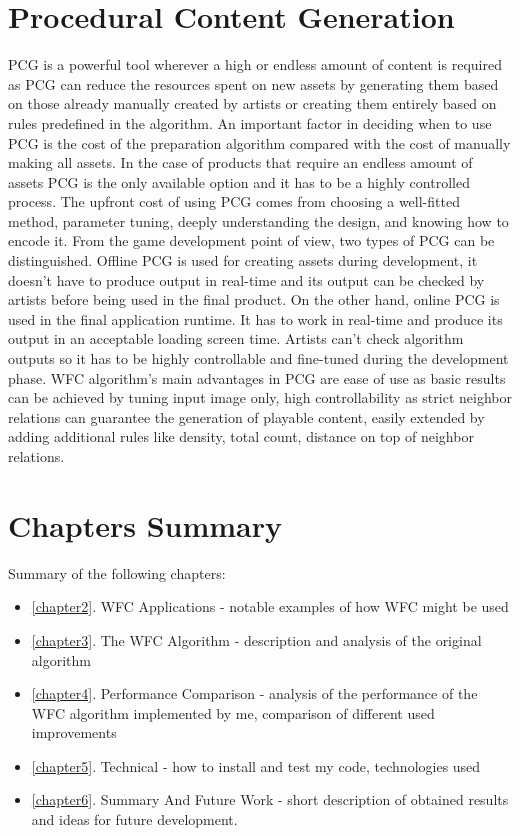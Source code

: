 \documentclass[shortabstract, english, inz]{iithesis}
\begin{document}
\section{Procedural Content Generation}
PCG is a powerful tool wherever a high or endless amount of content is required as PCG can reduce the resources spent on new assets by generating them based on those already manually created by artists or creating them entirely based on rules predefined in the algorithm. An important factor in deciding when to use PCG is the cost of the preparation algorithm compared with the cost of manually making all assets. In the case of products that require an endless amount of assets PCG is the only available option and it has to be a highly controlled process. The upfront cost of using PCG comes from choosing a well-fitted method, parameter tuning, deeply understanding the design, and knowing how to encode it.
From the game development point of view, two types of PCG can be distinguished. Offline PCG is used for creating assets during development, it doesn't have to produce output in real-time and its output can be checked by artists before being used in the final product. On the other hand, online PCG is used in the final application runtime. It has to work in real-time and produce its output in an acceptable loading screen time. Artists can't check algorithm outputs so it has to be highly controllable and fine-tuned during the development phase.\cite{DesignLevelConstraints}\break\break
WFC algorithm's main advantages in PCG are ease of use as basic results can be achieved by tuning input image only, high controllability as strict neighbor relations can guarantee the generation of playable content, easily extended by adding additional rules like density, total count, distance on top of neighbor relations. \cite{Smith, DesignLevelConstraints}

\section{Chapters Summary}
Summary of the following chapters:
\begin{itemize}
    \item \ref{chapter2}. WFC Applications - notable examples of how WFC might be used
    \item \ref{chapter3}. The WFC Algorithm - description and analysis of the original algorithm
    \item \ref{chapter4}. Performance Comparison - analysis of the performance of the WFC algorithm implemented by me, comparison of different used improvements
    \item \ref{chapter5}. Technical - how to install and test my code, technologies used
    \item \ref{chapter6}. Summary And Future Work - short description of obtained results and ideas for future development.
\end{itemize}
\end{document}
